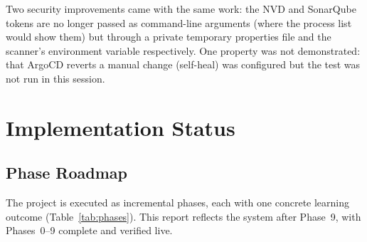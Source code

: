 \documentclass[11pt,a4paper]{article}
\begin{document}
Two security improvements came with the same work: the NVD and SonarQube
tokens are no longer passed as command-line arguments (where the process list
would show them) but through a private temporary properties file and the
scanner's environment variable respectively. One property was not demonstrated:
that ArgoCD reverts a manual change (self-heal) was configured but the test
was not run in this session.

\section{Implementation Status}

\subsection{Phase Roadmap}
The project is executed as incremental phases, each with one concrete
learning outcome (Table~\ref{tab:phases}). This report reflects the system
after Phase~9, with Phases~0--9 complete and verified live.
\end{document}
